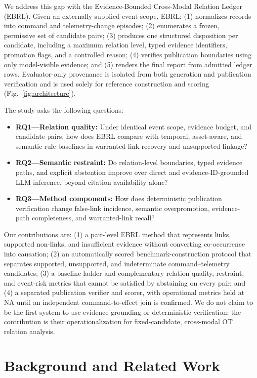 \documentclass[conference]{IEEEtran}
\newcommand{\NA}{\textsc{NA}}
\begin{document}
We address this gap with the Evidence-Bounded Cross-Modal Relation Ledger (EBRL). Given an externally supplied event scope, EBRL: (1) normalizes records into command and telemetry-change episodes; (2) enumerates a frozen, permissive set of candidate pairs; (3) produces one structured disposition per candidate, including a maximum relation level, typed evidence identifiers, promotion flags, and a controlled reason; (4) verifies publication boundaries using only model-visible evidence; and (5) renders the final report from admitted ledger rows. Evaluator-only provenance is isolated from both generation and publication verification and is used solely for reference construction and scoring (Fig.~\ref{fig:architecture}).

The study asks the following questions:
\begin{itemize}
    \item \textbf{RQ1---Relation quality:} Under identical event scope, evidence budget, and candidate pairs, how does EBRL compare with temporal, asset-aware, and semantic-rule baselines in warranted-link recovery and unsupported linkage?
    \item \textbf{RQ2---Semantic restraint:} Do relation-level boundaries, typed evidence paths, and explicit abstention improve over direct and evidence-ID-grounded LLM inference, beyond citation availability alone?
    \item \textbf{RQ3---Method components:} How does deterministic publication verification change false-link incidence, semantic overpromotion, evidence-path completeness, and warranted-link recall?
\end{itemize}

Our contributions are: (1) a pair-level EBRL method that represents links, supported non-links, and insufficient evidence without converting co-occurrence into causation; (2) an automatically scored benchmark-construction protocol that separates supported, unsupported, and indeterminate command--telemetry candidates; (3) a baseline ladder and complementary relation-quality, restraint, and event-risk metrics that cannot be satisfied by abstaining on every pair; and (4) a separated publication verifier and scorer, with operational metrics held at \NA{} until an independent command-to-effect join is confirmed. We do not claim to be the first system to use evidence grounding or deterministic verification; the contribution is their operationalization for fixed-candidate, cross-modal OT relation analysis.

\section{Background and Related Work}
\end{document}
